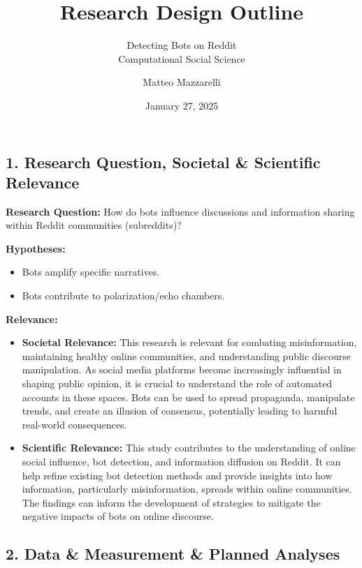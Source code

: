 \documentclass[
  letterpaper,
  DIV=11,
  numbers=noendperiod]{scrartcl}
\title{Research Design Outline}
\subtitle{Detecting Bots on Reddit\\
Computational Social Science}
\author{Matteo Mazzarelli}
\date{January 27, 2025}
\providecommand{\tightlist}{%
  \setlength{\itemsep}{0pt}\setlength{\parskip}{0pt}}\usepackage{longtable,booktabs,array}
\begin{document}
\maketitle


\subsection{1. Research Question, Societal \& Scientific
Relevance}\label{research-question-societal-scientific-relevance}

\textbf{Research Question:} How do bots influence discussions and
information sharing within Reddit communities (subreddits)?

\textbf{Hypotheses:}

\begin{itemize}
\tightlist
\item
  Bots amplify specific narratives.
\item
  Bots contribute to polarization/echo chambers.
\end{itemize}

\textbf{Relevance:}

\begin{itemize}
\tightlist
\item
  \textbf{Societal Relevance:} This research is relevant for combating
  misinformation, maintaining healthy online communities, and
  understanding public discourse manipulation. As social media platforms
  become increasingly influential in shaping public opinion, it is
  crucial to understand the role of automated accounts in these spaces.
  Bots can be used to spread propaganda, manipulate trends, and create
  an illusion of consensus, potentially leading to harmful real-world
  consequences.
\item
  \textbf{Scientific Relevance:} This study contributes to the
  understanding of online social influence, bot detection, and
  information diffusion on Reddit. It can help refine existing bot
  detection methods and provide insights into how information,
  particularly misinformation, spreads within online communities. The
  findings can inform the development of strategies to mitigate the
  negative impacts of bots on online discourse.
\end{itemize}

\subsection{2. Data \& Measurement \& Planned
Analyses}\label{data-measurement-planned-analyses}
\end{document}
